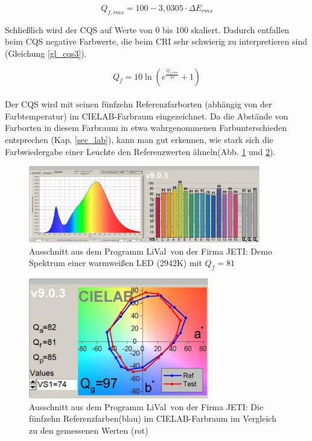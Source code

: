 \begin{equation}\label{gl_cqs2}
		Q_{f,rms} = 100 - 3,0305 \cdot \Delta E_{rms} 
\end{equation}

Schließlich wird der CQS auf Werte von 0 bis 100 skaliert. Dadurch entfallen beim CQS negative Farbwerte, die beim CRI sehr schwierig zu interpretieren sind (Gleichung \ref{gl_cqs3}). 

\begin{equation}\label{gl_cqs3}
		Q_{f} = 10 \ln(e^{\frac{Q_{f,rms}}{10}}+1) 
\end{equation}\\

Der CQS wird mit seinen fünfzehn Referenzfarborten (abhängig von der Farbtemperatur) im CIELAB-Farbraum eingezeichnet. Da die Abstände von Farborten in diesem Farbraum in etwa wahrgenommenen Farbunterschieden entsprechen (Kap. \ref{sec_lab}), kann man gut erkennen, wie stark sich die Farbwiedergabe einer Leuchte den Referenzwerten ähneln(Abb. \ref{b_cqs2a} und \ref{b_cqs2b}).\\

\begin{figure}[htp]     %
\centering
\includegraphics[width=0.9\textwidth]{bilder/cqs2a} 
\caption {Ausschnitt aus dem Programm \glqq LiVal\grqq\ von der Firma JETI: Demo Spektrum einer warmweißen LED (2942K) mit $Q_{f} = 81$}\label{b_cqs2a}
\end{figure}

\begin{figure}[htp]     %
\centering
\includegraphics[width=0.7\textwidth]{bilder/cqs2b} 
\caption {Ausschnitt aus dem Programm \glqq LiVal\grqq\ von der Firma JETI: Die fünfzehn Referenzfarben(blau) im CIELAB-Farbraum im Vergleich zu den gemessenen Werten (rot)}\label{b_cqs2b}
\end{figure}

